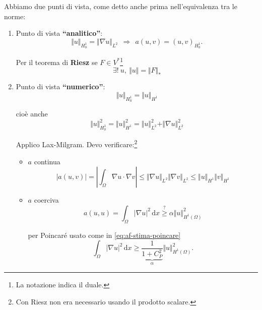 \documentclass[10pt,a4paper,twoside,openright]{book}
\newcommand{\de}{\,\mathrm d}
\newcommand{\dx}{\de x}
\begin{document}
Abbiamo due punti di vista, come detto anche prima nell'equivalenza tra le norme:
\begin{enumerate}
    \item Punto di vista \textbf{``analitico''}:
          \begin{equation*}
              \boxed{\Vert u\Vert _{H_{0}^{1}} =\Vert \nabla u\Vert _{L^{2}}} \ \ \Rightarrow \ \ a(u,v) =(u,v)_{H_{0}^{1}} .
          \end{equation*}

          Per il teorema di \textbf{Riesz }se $\displaystyle F\in V^{*}$\footnote{La notazione indica il duale.}
          \begin{equation*}
              \exists !\ u,\ \Vert u\Vert =\Vert F\Vert _{*}
          \end{equation*}
    \item Punto di vista \textbf{``numerico''}:
          \begin{equation*}
              \boxed{\Vert u\Vert _{H_{0}^{1}} =\Vert u\Vert _{H^{1}}}
          \end{equation*}

          cioè anche
          \begin{equation*}
              \Vert u\Vert _{H_{0}^{1}}^{2} =\Vert u\Vert _{H^{1}}^{2} =\Vert u\Vert _{L^{2}}^{2} +\Vert \nabla u\Vert _{L^{2}}^{2}
          \end{equation*}

          Applico Lax-Milgram. Devo verificare:\footnote{Con Riesz non era necessario usando il prodotto scalare.}
          \begin{itemize}
              \item $a$ continua
                    \begin{equation*}
                        | a(u,v)| =\left| \int _{\Omega } \nabla u\cdotp \nabla v\right| \leqslant \Vert \nabla u\Vert _{L^{2}}\Vert \nabla v\Vert _{L^{2}} \leqslant \Vert u\Vert _{H^{1}}\Vert v\Vert _{H^{1}}
                    \end{equation*}
              \item $a$ coerciva
                    \begin{equation*}
                        a(u,u) =\int _{\Omega }| \nabla u| ^{2} \dx\overset{?}{\geqslant } \alpha \Vert u\Vert _{H^{1}(\Omega)}^{2}
                    \end{equation*}

                    per Poincaré usato come in \eqref{eq:af-stima-poincare}
                    \begin{equation*}
                        \int _{\Omega }| \nabla u| ^{2} \dx\geqslant \underbrace{\frac{1}{1+C_{P}^{2}}}_{\alpha}\Vert u\Vert _{H^{1}(\Omega)}^{2} .
                    \end{equation*}
          \end{itemize}
\end{enumerate}
\end{document}
